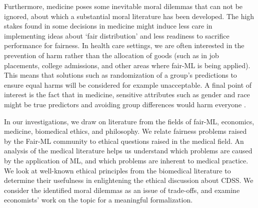 Furthermore, medicine poses some inevitable moral dilemmas that can not be ignored, about which a substantial moral literature has been developed.
The high stakes found in some decisions in medicine might induce less care in implementing ideas about `fair distribution' and less readiness to sacrifice performance for fairness.
In health care settings, we are often interested in the prevention of harm rather than the allocation of goods (such as in job placements, college admissions, and other areas where fair-ML is being applied).
This means that solutions such as randomization of a group's predictions to ensure equal harms will be considered for example unacceptable.
A final point of interest is the fact that in medicine, sensitive attributes such as gender and race might be true predictors and avoiding group differences would harm everyone \cite{Mccradden2020}.



In our investigations, we draw on literature from the fields of fair-ML, economics, medicine, biomedical ethics, and philosophy.
We relate fairness problems raised by the Fair-ML community to ethical questions raised in the medical field.
An analysis of the medical literature helps us understand which problems are caused by the application of ML, and which problems are inherent to medical practice.
We look at well-known ethical principles from the biomedical literature to determine their usefulness in enlightening the ethical discussion about CDSS.
We consider the identified moral dilemmas as an issue of trade-offs, and examine economists' work on the topic for a meaningful formalization.

